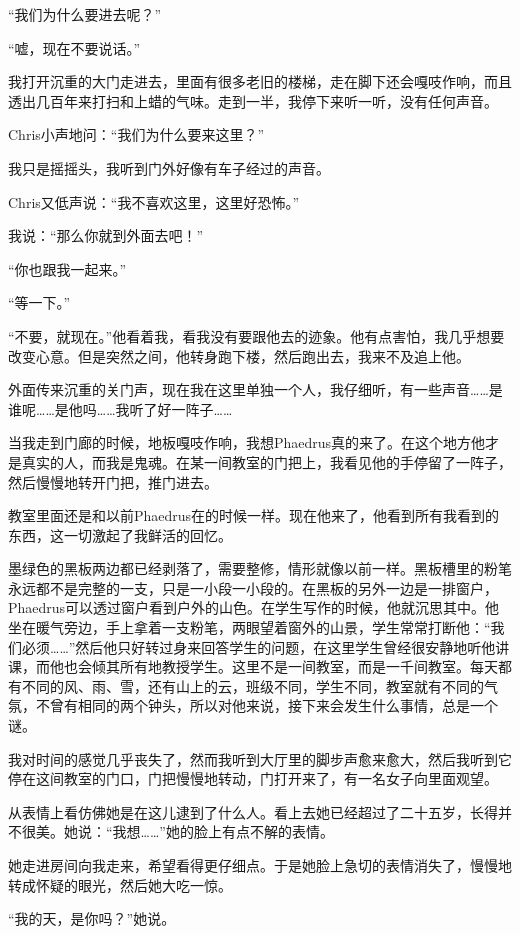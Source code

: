 \documentclass[UTF8]{article}
\begin{document}
\par “我们为什么要进去呢？”
\par “嘘，现在不要说话。”
\par 我打开沉重的大门走进去，里面有很多老旧的楼梯，走在脚下还会嘎吱作响，而且透出几百年来打扫和上蜡的气味。走到一半，我停下来听一听，没有任何声音。
\par Chris小声地问：“我们为什么要来这里？”
\par 我只是摇摇头，我听到门外好像有车子经过的声音。
\par Chris又低声说：“我不喜欢这里，这里好恐怖。”
\par 我说：“那么你就到外面去吧！”
\par “你也跟我一起来。”
\par “等一下。”
\par “不要，就现在。”他看着我，看我没有要跟他去的迹象。他有点害怕，我几乎想要改变心意。但是突然之间，他转身跑下楼，然后跑出去，我来不及追上他。
\par 外面传来沉重的关门声，现在我在这里单独一个人，我仔细听，有一些声音……是谁呢……是他吗……我听了好一阵子……
\par 当我走到门廊的时候，地板嘎吱作响，我想Phaedrus真的来了。在这个地方他才是真实的人，而我是鬼魂。在某一间教室的门把上，我看见他的手停留了一阵子，然后慢慢地转开门把，推门进去。
\par 教室里面还是和以前Phaedrus在的时候一样。现在他来了，他看到所有我看到的东西，这一切激起了我鲜活的回忆。
\par 墨绿色的黑板两边都已经剥落了，需要整修，情形就像以前一样。黑板槽里的粉笔永远都不是完整的一支，只是一小段一小段的。在黑板的另外一边是一排窗户，Phaedrus可以透过窗户看到户外的山色。在学生写作的时候，他就沉思其中。他坐在暖气旁边，手上拿着一支粉笔，两眼望着窗外的山景，学生常常打断他：“我们必须……”然后他只好转过身来回答学生的问题，在这里学生曾经很安静地听他讲课，而他也会倾其所有地教授学生。这里不是一间教室，而是一千间教室。每天都有不同的风、雨、雪，还有山上的云，班级不同，学生不同，教室就有不同的气氛，不曾有相同的两个钟头，所以对他来说，接下来会发生什么事情，总是一个谜。
\par 我对时间的感觉几乎丧失了，然而我听到大厅里的脚步声愈来愈大，然后我听到它停在这间教室的门口，门把慢慢地转动，门打开来了，有一名女子向里面观望。
\par 从表情上看仿佛她是在这儿逮到了什么人。看上去她已经超过了二十五岁，长得并不很美。她说：“我想……”她的脸上有点不解的表情。
\par 她走进房间向我走来，希望看得更仔细点。于是她脸上急切的表情消失了，慢慢地转成怀疑的眼光，然后她大吃一惊。
\par “我的天，是你吗？”她说。
\end{document}
